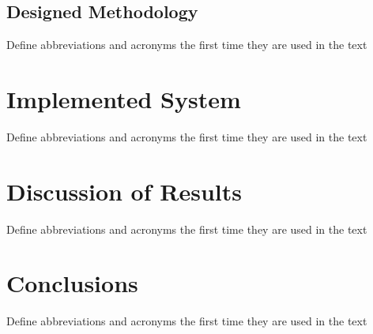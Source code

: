 \documentclass[conference]{style/IEEEtran}
\begin{document}
\subsection{Designed Methodology}
Define abbreviations and acronyms the first time they are used in the text

\section{Implemented System}
Define abbreviations and acronyms the first time they are used in the text

\section{Discussion of Results}
Define abbreviations and acronyms the first time they are used in the text

\section{Conclusions}
Define abbreviations and acronyms the first time they are used in the text
\end{document}
